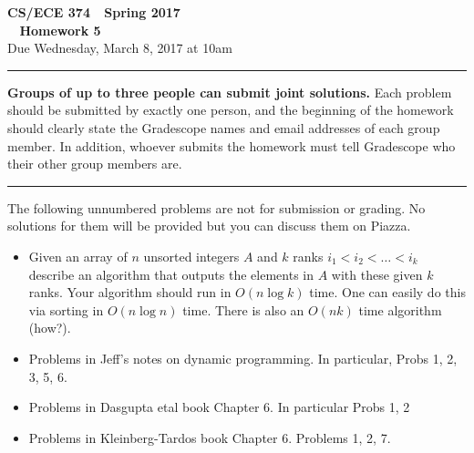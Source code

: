 \documentclass[11pt]{article}
\begin{document}

\thispagestyle{empty}

\begin{center}
\Large\textbf{CS/ECE 374 \,\decosix\,  Spring 2017}%
\\
\LARGE\textbf{\decothreeleft~ Homework 5 ~\decothreeright}%
\\[0.5ex]
\large Due Wednesday, March 8, 2017 at 10am
\end{center}

\bigskip
\hrule
\bigskip

\noindent
\textbf{Groups of up to three people can submit joint solutions.}  Each problem should be submitted by exactly one person, and the beginning of the homework should clearly state the Gradescope names and email addresses of each group member.  In addition, whoever submits the homework must tell Gradescope who their other group members are.
\bigskip
\hrule
\bigskip


\noindent
The following unnumbered problems are not for submission or grading. 
No solutions for them will be provided but you can discuss them on Piazza.
\begin{itemize}
\item Given an array of $n$ unsorted integers $A$ and $k$ ranks
  $i_1 < i_2 < \ldots < i_k$ describe an algorithm that outputs
  the elements in $A$ with these given $k$ ranks. Your algorithm
  should run in $O(n \log k)$ time. One can easily do this via
  sorting in $O(n \log n)$ time. There is also an $O(nk)$ time algorithm
  (how?). 
\item Problems in Jeff's notes on dynamic programming. 
In particular, Probs 1, 2, 3, 5, 6.
\item Problems in Dasgupta etal book Chapter 6. In particular Probs 1, 2
\item Problems in Kleinberg-Tardos book Chapter 6. Problems 1, 2, 7.
\end{itemize}

\vspace{1cm}
\end{document}

